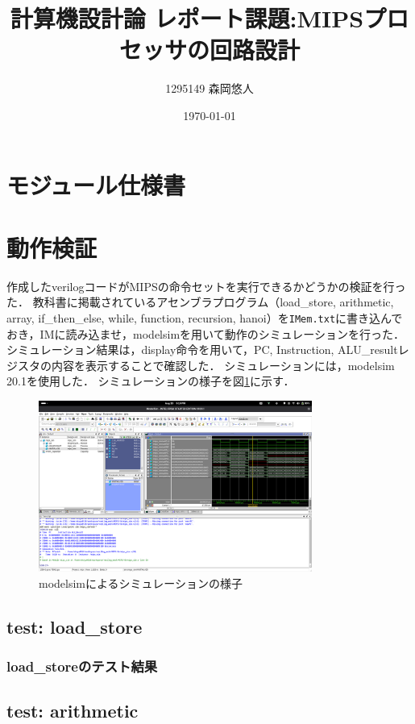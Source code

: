 \documentclass[dvipdfmx]{jsarticle}
\title{計算機設計論 レポート課題:MIPSプロセッサの回路設計}
\author{1295149 森岡悠人\\}
\date{\today}
\begin{document}
\maketitle

\section{モジュール仕様書}

\section{動作検証}
作成したverilogコードがMIPSの命令セットを実行できるかどうかの検証を行った．
教科書\cite{textbook}に掲載されているアセンブラプログラム（load\_store, arithmetic, array, if\_then\_else, while, function, recursion, hanoi）を\texttt{IMem.txt}に書き込んでおき，IMに読み込ませ，modelsimを用いて動作のシミュレーションを行った．
シミュレーション結果は，display命令を用いて，PC, Instruction, ALU\_resultレジスタの内容を表示することで確認した．
シミュレーションには，modelsim 20.1を使用した．
シミュレーションの様子を図\ref{fig:simulation}に示す．

\begin{figure}[h]
\centering
  \includegraphics[width=0.8\textwidth]{modelsim.png}
  \caption{modelsimによるシミュレーションの様子}
  \label{fig:simulation}
\end{figure}

\subsection{test: load\_store}
\subsubsection{load\_storeのテスト結果}

\subsection{test: arithmetic}
\end{document}
